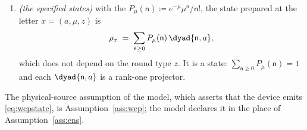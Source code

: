 \begin{definition}
\begin{enumerate}[label=(W\arabic*),leftmargin=3.0em]
\begin{equation}
  \ket{\mathsf{n},a}\;\coloneqq\;
  \frac{(c^{\dagger}_a)^{\mathsf{n}}}{\sqrt{\mathsf{n}!}}\,\ket{\vac} ,
\end{equation}
and the subspace
$S_{\mathsf{n}}\coloneqq\operatorname{span}\{\ket{\mathsf{n},a}:a\in\mathrm{Pol}\}$
of the $\mathsf{n}$-photon subspace. Since the $\mathsf{n}$-photon subspace of
a two-mode Fock space has dimension $\mathsf{n}+1$ and $S_{\mathsf{n}}$ is
spanned by $|\mathrm{Pol}|$ vectors,
$\dim S_{\mathsf{n}}\le\min(\mathsf{n}+1,|\mathrm{Pol}|)$; and
$S_{\mathsf{n}}\perp S_{\mathsf{n}'}$ for $\mathsf{n}\ne\mathsf{n}'$, the two
subspaces lying in different photon-number eigenspaces.
$S_0=\mathbb{C}\ket{\vac}$ is one dimensional, every polarisation sharing the
vacuum.
\item \emph{(the specified states)} with the
$P_{\mu}(\mathsf{n})\coloneqq e^{-\mu}\mu^{\mathsf{n}}/\mathsf{n}!$, the state
prepared at the letter $x=(a,\mu,z)$ is
\begin{equation}\label{eq:wcpstate}
  \rho_x\;=\;\sum_{\mathsf{n}\ge0}P_{\mu}(\mathsf{n})\,
  \dyad{\mathsf{n},a} ,
\end{equation}
which does not depend on the round type $z$. It is a state:
$\sum_{\mathsf{n}\ge0}P_{\mu}(\mathsf{n})=1$ and each $\dyad{\mathsf{n},a}$
is a rank-one projector.
\end{enumerate}
The physical-source assumption of the model, which asserts that the device
emits \eqref{eq:wcpstate}, is Assumption~\ref{ass:wcp}; the model declares it
in the place of Assumption~\ref{ass:ens}.
\end{definition}
